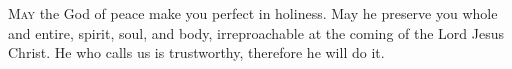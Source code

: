 \lettrine[lines=3,loversize=0.15]{M}{ay} the God of peace make you perfect in holiness. May he preserve you whole and entire, spirit, soul, and body, irreproachable at the coming of the Lord Jesus Christ. He who calls us is trustworthy, therefore he will do it.
